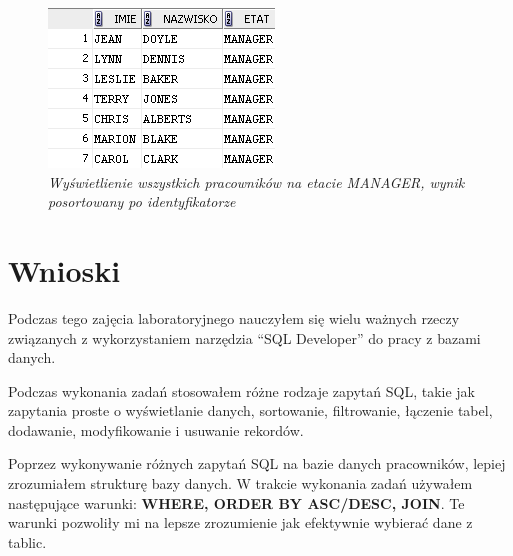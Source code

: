 \documentclass[a4paper, 10pt]{article}
\begin{document}
\begin{enumerate}
\begin{figure}[H]
	\centering 
	\includegraphics[scale=0.7]{zadanie11.png}
	\caption{\textit{Wyświetlienie wszystkich pracowników na etacie MANAGER, wynik posortowany po identyfikatorze}}
	\label{fig:join_etat_manager}
\end{figure}
\end{enumerate}

\section{Wnioski}

Podczas tego zajęcia laboratoryjnego nauczyłem się wielu ważnych rzeczy związanych z wykorzystaniem narzędzia ``SQL Developer'' do pracy z bazami danych.

Podczas wykonania zadań stosowałem różne rodzaje zapytań SQL, takie jak zapytania proste o wyświetlanie danych, sortowanie, filtrowanie, łączenie tabel, dodawanie, modyfikowanie i usuwanie rekordów.

Poprzez wykonywanie różnych zapytań SQL na bazie danych pracowników, lepiej zrozumiałem strukturę bazy danych. W trakcie wykonania zadań używałem następujące warunki: \textbf{WHERE, ORDER BY ASC/DESC, JOIN}. Te warunki pozwoliły mi na lepsze zrozumienie jak efektywnie wybierać dane z tablic.
\end{document}
